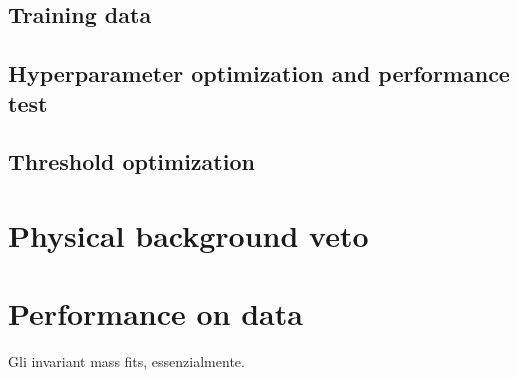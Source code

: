 \subsection{Training data}

\subsection{Hyperparameter optimization and performance test}

\subsection{Threshold optimization}

\section{Physical background veto}
\label{sec:B0_veto}

\section{Performance on data}
Gli invariant mass fits, essenzialmente.